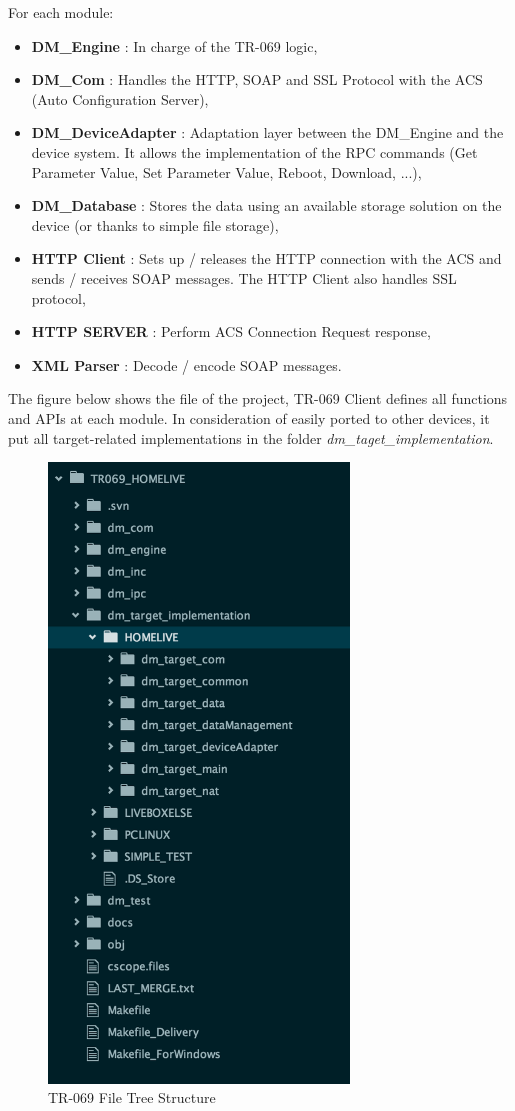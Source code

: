 For each module:
\begin{itemize}
  \item \textbf{DM_Engine} : In charge of the TR-069 logic,
  \item \textbf{DM_Com} : Handles the HTTP, SOAP and SSL Protocol with the ACS (Auto Configuration Server),
  \item \textbf{DM_DeviceAdapter} : Adaptation layer between the DM_Engine and the device system. It allows the implementation of the RPC commands (Get Parameter Value, Set Parameter Value, Reboot, Download, ...),
  \item \textbf{DM_Database} : Stores the data using an available storage solution on the device (or thanks to simple file storage),
  \item \textbf{HTTP Client} : Sets up / releases the HTTP connection with the ACS and sends / receives SOAP messages. The HTTP Client also handles SSL protocol,
  \item \textbf{HTTP SERVER} : Perform ACS Connection Request response,
  \item \textbf{XML Parser} : Decode / encode SOAP messages.
\end{itemize}

The figure below shows the file of the project, TR-069 Client defines all functions and APIs at each module. In consideration of easily ported to other devices, it put all target-related implementations in the folder \textit{dm_taget_implementation}.

\begin{figure}[htbp]
	\centering
		\includegraphics[width=8cm]{Figures/tr069_files.png}
	\caption[TR-069 File Tree Structure]{TR-069 File Tree Structure}
	\label{fig:tr069file}
\end{figure}


